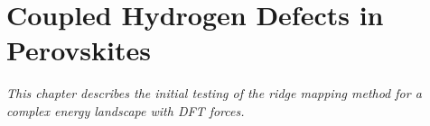\chapter{Coupled Hydrogen Defects in Perovskites}
\label{chap:perovskites}
\textit{This chapter describes the initial testing of the ridge mapping method for a complex energy landscape with DFT forces.}



